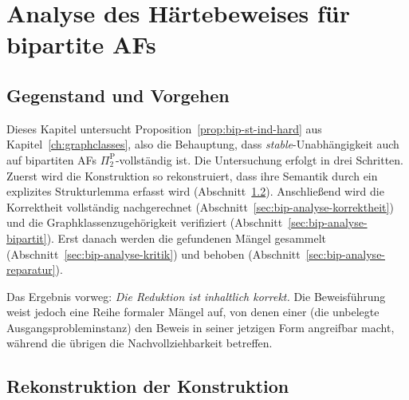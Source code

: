 %
%

\chapter{Analyse des Härtebeweises für bipartite AFs}
\label{ch:bip-analyse}

\section{Gegenstand und Vorgehen}
\label{sec:bip-analyse-gegenstand}

Dieses Kapitel untersucht Proposition~\ref{prop:bip-st-ind-hard} aus
Kapitel~\ref{ch:graphclasses}, also die Behauptung, dass
\textit{stable}-Unabhängigkeit auch auf bipartiten AFs
\(\Pi_2^\text{P}\)-vollständig ist. Die Untersuchung erfolgt in drei Schritten.
Zuerst wird die Konstruktion so rekonstruiert, dass ihre Semantik durch ein
explizites Strukturlemma erfasst wird (Abschnitt~\ref{sec:bip-analyse-struktur}).
Anschließend wird die Korrektheit vollständig nachgerechnet
(Abschnitt~\ref{sec:bip-analyse-korrektheit}) und die
Graphklassenzugehörigkeit verifiziert
(Abschnitt~\ref{sec:bip-analyse-bipartit}). Erst danach werden die gefundenen
Mängel gesammelt (Abschnitt~\ref{sec:bip-analyse-kritik}) und behoben
(Abschnitt~\ref{sec:bip-analyse-reparatur}).

Das Ergebnis vorweg: \emph{Die Reduktion ist inhaltlich korrekt.} Die
Beweisführung weist jedoch eine Reihe formaler Mängel auf, von denen einer
(die unbelegte Ausgangsprobleminstanz) den Beweis in seiner jetzigen Form
angreifbar macht, während die übrigen die Nachvollziehbarkeit betreffen.

\section{Rekonstruktion der Konstruktion}
\label{sec:bip-analyse-struktur}

